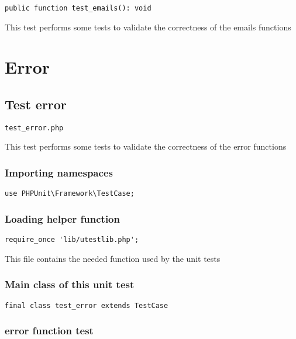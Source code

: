 \documentclass[a4paper]{article}
\begin{document}
\begin{lstlisting}
public function test_emails(): void
\end{lstlisting}

This test performs some tests to validate the correctness
of the emails functions


\hypertarget{toc158}{}
\section{Error}

\hypertarget{toc159}{}
\subsection{Test error}

\begin{lstlisting}
test_error.php
\end{lstlisting}

This test performs some tests to validate the correctness
of the error functions

\hypertarget{toc160}{}
\subsubsection{Importing namespaces}

\begin{lstlisting}
use PHPUnit\Framework\TestCase;
\end{lstlisting}

\hypertarget{toc161}{}
\subsubsection{Loading helper function}

\begin{lstlisting}
require_once 'lib/utestlib.php';
\end{lstlisting}

This file contains the needed function used by the unit tests

\hypertarget{toc162}{}
\subsubsection{Main class of this unit test}

\begin{lstlisting}
final class test_error extends TestCase
\end{lstlisting}

\hypertarget{toc163}{}
\subsubsection{error function test}
\end{document}
